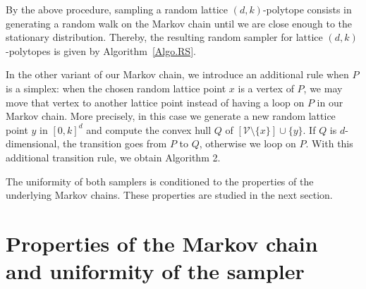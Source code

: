 \documentclass[a4paper]{article}
\newtheorem{remark}{Remark}
\begin{document}
By the above procedure, sampling a random lattice $(d,k)$-polytope consists in generating a random walk on the Markov chain until we are close enough to the stationary distribution. Thereby, the resulting random sampler for lattice $(d,k)$-polytopes is given by Algorithm~\ref{Algo.RS}.\\



\vspace{0.2cm}
%

In the other variant of our Markov chain, we introduce an additional rule when $P$ is a simplex: when the chosen random lattice point $x$ is a vertex of $P$, we may move that vertex to another lattice point instead of having a loop on $P$ in our Markov chain. More precisely, in this case we generate a new random lattice point $y$ in $[0,k]^d$ and compute the convex hull $Q$ of $[\mathcal{V}\mathord{\setminus}\{x\}]\cup\{y\}$. If $Q$ is $d$-dimensional, the transition goes from $P$ to $Q$, otherwise we loop on $P$. With this additional transition rule, we obtain Algorithm 2.\\



\vspace{0.2cm}

The uniformity of both samplers is conditioned to the properties of the underlying Markov chains. These properties are studied in the next section.

\section{Properties of the Markov chain and uniformity of the sampler}\label{Sec.Pr}
\end{document}
